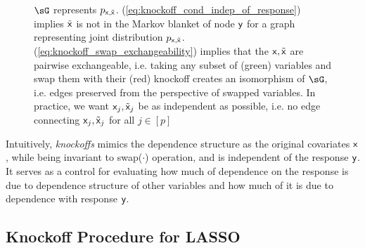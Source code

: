 \documentclass[11pt]{article}
\begin{document}
\begin{figure}[h!]
    \caption{$\sG$ represents $p_{\mathsf{x},\tilde{\mathsf{x}}}$. (\ref{eq:knockoff_cond_indep_of_response}) implies $\tilde{\mathsf{x}}$ is not in the Markov blanket of node $\mathsf{y}$ for a graph representing joint distribution $p_{\mathsf{x},\tilde{\mathsf{x}}}$. (\ref{eq:knockoff_swap_exchangeability}) implies that the $\mathsf{x},\tilde{\mathsf{x}}$ are pairwise exchangeable, i.e. taking any subset of (green) variables and swap them with their (red) knockoff creates an isomorphism of $\sG$, i.e. edges preserved from the perspective of swapped variables. In practice, we want $\mathsf{x}_j,\tilde{\mathsf{x}}_j$ be as independent as possible, i.e. no edge connecting $\mathsf{x}_j,\tilde{\mathsf{x}}_j$ for all $j\in[p]$}
\end{figure}
\noindent Intuitively, \textit{knockoffs} mimics the dependence structure as the original covariates $\mathsf{x}$, while being invariant to \textsf{swap($\cdot$)} operation, and is independent of the response $\mathsf{y}$. It serves as a control for evaluating how much of dependence on the response is due to dependence structure of other variables and how much of it is due to dependence with response $\mathsf{y}$.
  

\subsection{Knockoff Procedure for LASSO}
\end{document}

